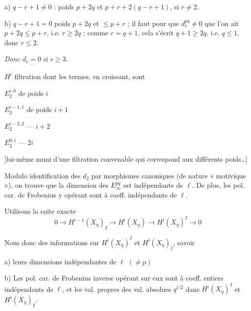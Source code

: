 \documentclass[11pt,a4paper]{article}
\begin{document}
a) $q - r + 1 \neq 0$ : poids $p+2q$ et $p + r + 2(q-r+1)$,  si $r \neq 2$.

b) $q - r + 1 = 0$  poids $p+2q$ et $\leq p+r$ ; il faut pour que
$d_{r}^{pq} \neq 0$ que l'on ait $p+2q \leq p+r$, i.e. $r \geq 2q$ ; comme $r = q+1$,
cela s'écrit $q+1 \geq 2q$, i.e. $q \leq 1$, donc $r \leq 2$.

\emph{Donc} $\underline{d_{r} = 0}$ si $r \geq 3$.


$H^{i}$ filtration dont les termes, en croissant, sont

$E_{2}^{i,0}$ de poids \struck{\ill{}} $i$

$E_{2}^{i-1,1}$ de poids $i+1$

$E_{2}^{i-2,2}$ — $i+2$

$E_{2}^{0,i}$ — $2i$

[lui-même muni d'une filtration convenable qui correspond aux différents poids…]


Modulo identification des $d_{2}$ par morphismes canoniques (de nature « motivique »),
on trouve que la dimension des $E_{\infty}^{pq}$ est indépendante de $\ell$. De plus, les
 pol. car. de Frobenius  y opérant sont à coeff.
 \ill{} indépendants de $\ell$.


Utilisons la suite exacte
\[
  0 \longrightarrow H^{i-1}(X_{\bar\eta})_{I} \longrightarrow H^{i}(X_{\eta}) \longrightarrow H^{i}(X_{\bar\eta})^{I} \longrightarrow 0
  \tag{6}
\]

Nous   donc des informations sur
$H^{i}(X_{\bar\eta})^{I}$ et $H^{i}(X_{\bar\eta})_{I}$, savoir

a) leurs dimensions indépendantes de $\ell$ $(\neq p)$

b) Les pol. car. de Frobenius inverse opérant sur eux sont à coeff. entiers
indépendants de $\ell$, et les val. propres \ill{} \ill{} des val. absolues $q^{i/2}$
dans $H^{i}(X_{\bar\eta})^{I}$ et $H^{i}(X_{\bar\eta})_{I}$.
\end{document}
